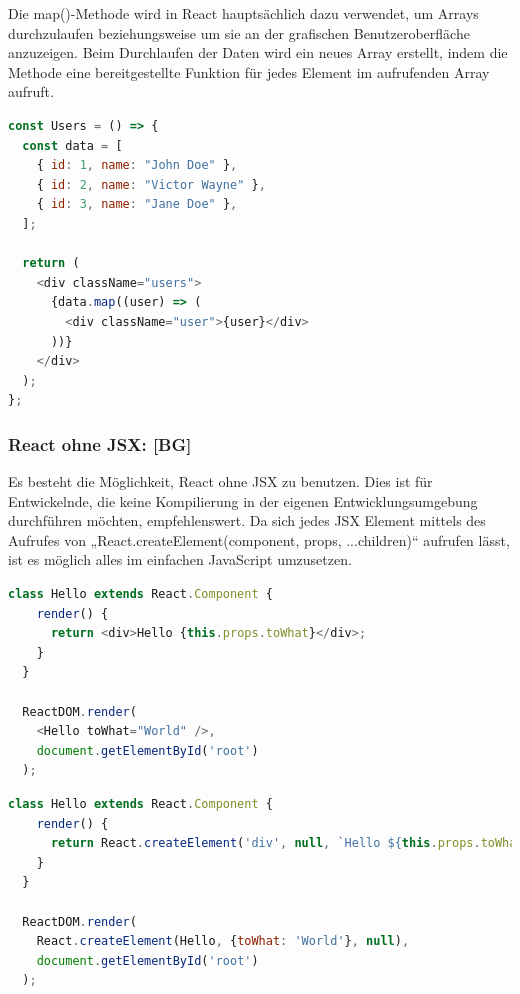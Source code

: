 Die map()-Methode wird in React hauptsächlich dazu verwendet, um Arrays durchzulaufen beziehungsweise um sie an der grafischen Benutzeroberfläche anzuzeigen. Beim Durchlaufen der Daten wird ein neues Array erstellt, indem die Methode eine bereitgestellte Funktion für jedes Element im aufrufenden Array aufruft.
\cite{Map}

\begin{lstlisting}[language=JavaScript, caption=Beispiel Code für die Nutzung der map()-Methode, label=lst:impl:mapMethode]
  const Users = () => {
  const data = [
    { id: 1, name: "John Doe" },
    { id: 2, name: "Victor Wayne" },
    { id: 3, name: "Jane Doe" },
  ];

  return (
    <div className="users">
      {data.map((user) => (
        <div className="user">{user}</div>
      ))}
    </div>
  );
};
\end{lstlisting} \cite{Map}

\subsubsection{React ohne JSX: [BG]}
Es besteht die Möglichkeit, React ohne JSX zu benutzen. Dies ist für Entwickelnde, die keine Kompilierung in der eigenen Entwicklungsumgebung durchführen möchten, empfehlenswert.
Da sich jedes JSX Element mittels des Aufrufes von „React.createElement(component, props, ...children)“ aufrufen lässt, ist es möglich alles im einfachen JavaScript umzusetzen.
\cite{JSX}

\begin{lstlisting}[language=JavaScript, caption=Beispiel Code 'Hello World' mit JSX, label=lst:impl:helloWorldJSX]
  class Hello extends React.Component {
    render() {
      return <div>Hello {this.props.toWhat}</div>;
    }
  }

  ReactDOM.render(
    <Hello toWhat="World" />,
    document.getElementById('root')
  );
\end{lstlisting} \cite{ReactWithoutJSX}

\begin{lstlisting}[language=JavaScript, caption='Hello World' mit einfachem JavaScript, label=lst:impl:helloWorldJSX]
  class Hello extends React.Component {
    render() {
      return React.createElement('div', null, `Hello ${this.props.toWhat}`);
    }
  }
  
  ReactDOM.render(
    React.createElement(Hello, {toWhat: 'World'}, null),
    document.getElementById('root')
  );
\end{lstlisting} \cite{ReactWithoutJSX}

